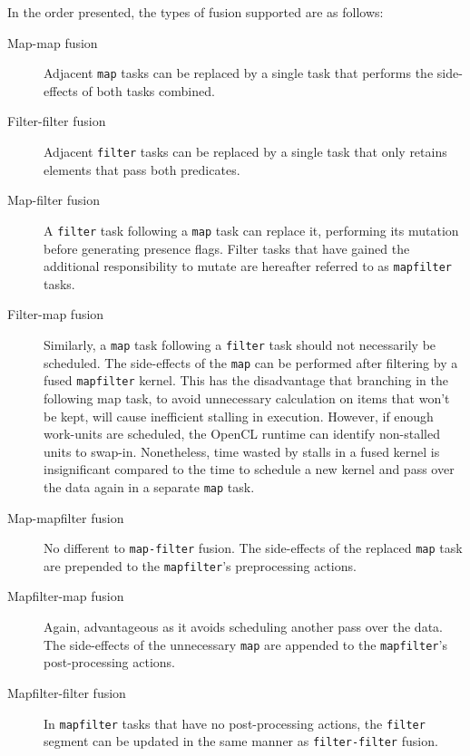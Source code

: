 In the order presented, the types of fusion supported are as follows:
\begin{description}
\item[Map-map fusion] Adjacent \verb|map| tasks can be replaced by a single task that performs the side-effects of both tasks combined.

\item[Filter-filter fusion] Adjacent \verb|filter| tasks can be replaced by a single task that only retains elements that pass both predicates.

\item[Map-filter fusion] A \verb|filter| task following a \verb|map| task can replace it, performing its mutation before generating presence flags. Filter tasks that have gained the additional responsibility to mutate are hereafter referred to as \verb|mapfilter| tasks.

\item[Filter-map fusion] Similarly, a \verb|map| task following a \verb|filter| task should not necessarily be scheduled. The side-effects of the \verb|map| can be performed after filtering by a fused \verb|mapfilter| kernel. This has the disadvantage that branching in the following map task, to avoid unnecessary calculation on items that won't be kept, will cause inefficient stalling in execution. However, if enough work-units are scheduled, the \ac{OpenCL} runtime can identify non-stalled units to swap-in. Nonetheless, time wasted by stalls in a fused kernel is insignificant compared to the time to schedule a new kernel and pass over the data again in a separate \verb|map| task.

\item[Map-mapfilter fusion] No different to \verb|map-filter| fusion. The side-effects of the replaced \verb|map| task are prepended to the \verb|mapfilter|'s preprocessing actions.

\item[Mapfilter-map fusion] Again, advantageous as it avoids scheduling another pass over the data. The side-effects of the unnecessary \verb|map| are appended to the \verb|mapfilter|'s post-processing actions.

\item[Mapfilter-filter fusion] In \verb|mapfilter| tasks that have no post-processing actions, the \verb|filter| segment can be updated in the same manner as \verb|filter-filter| fusion.
\end{description}

